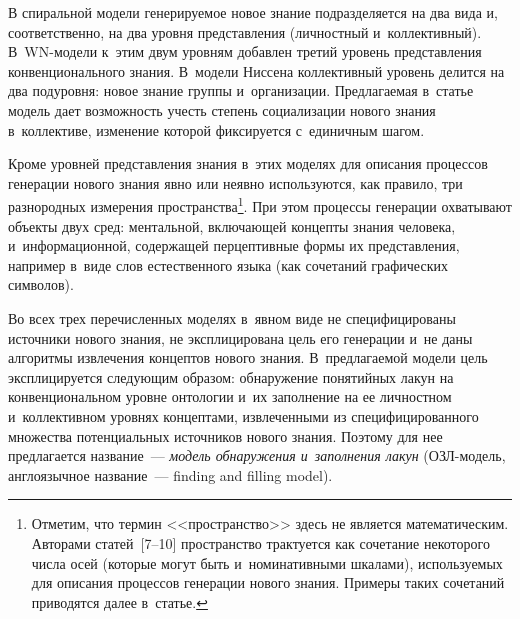 {\begin{multicols}{2}
  В спиральной модели генерируемое новое знание подразделяется на два вида 
и, соответственно, на два уровня представления (личностный и~коллективный). 
В~WN-мо\-де\-ли к~этим двум уровням добавлен третий уровень представления 
конвенционального знания. В~модели Ниссена коллективный уровень делится 
на два подуровня: новое знание группы и~организации. Предлагаемая в~\mbox{статье} 
модель дает возможность учесть степень социализации нового знания 
в~коллективе, изменение которой фиксируется с~единичным шагом. 
  
Кроме уровней представления знания в~этих моделях для описания процессов генерации нового знания явно 
или неявно используются, как правило, три разнородных измерения пространства\footnote{Отметим, что 
термин <<пространство>> здесь не является математическим. Авторами статей~[7--10] пространство 
трактуется как сочетание некоторого числа осей (которые могут быть и~номинативными шкалами), 
используемых для описания процессов генерации нового знания. Примеры таких сочетаний приводятся далее 
в~статье.}. При этом процессы генерации охватывают объекты двух сред: ментальной, включающей концепты 
знания человека, и~информационной, содержащей перцептивные 
формы их представления, например в~виде 
слов естественного языка (как сочетаний графических символов).
  
  Во всех трех перечисленных моделях в~явном виде не специфицированы 
источники нового знания, не эксплицирована цель его генерации и~не даны 
алгоритмы извлечения концептов нового знания. В~предлагаемой модели цель 
эксплицируется следующим образом: обнаружение понятийных лакун на 
конвенциональном уровне онтологии и~их заполнение на ее личностном 
и~коллективном уровнях концептами, извлеченными из специфицированного 
множества потенциальных источников нового знания. Поэтому для нее 
предлагается название~--- \textit{модель обнаружения и~заполнения лакун}  
(ОЗЛ-мо\-дель, англоязычное название~--- finding and filling model).
  

\end{multicols}}
